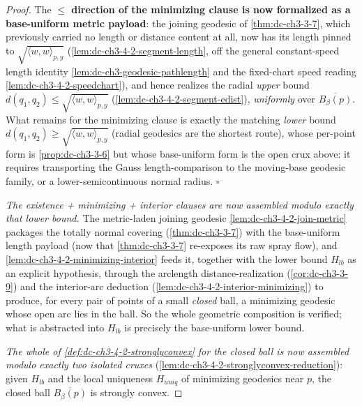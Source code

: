 \begin{proof}
  The \textbf{$\le$ direction of the minimizing clause is now formalized as a base-uniform metric
  payload}: the joining geodesic of \cref{thm:dc-ch3-3-7}, which previously carried no length or
  distance content at all, now has its length pinned to $\sqrt{\langle w,w\rangle_{p,y}}$
  (\cref{lem:dc-ch3-4-2-segment-length}, off the general constant-speed length identity
  \cref{lem:dc-ch3-geodesic-pathlength} and the fixed-chart speed reading
  \cref{lem:dc-ch3-4-2-speedchart}), and hence realizes the radial \emph{upper} bound
  $d(q_1,q_2)\le\sqrt{\langle w,w\rangle_{p,y}}$ (\cref{lem:dc-ch3-4-2-segment-edist}), \emph{uniformly}
  over $\overline{B_\beta(p)}$. What remains for the minimizing clause is exactly the matching
  \emph{lower} bound $d(q_1,q_2)\ge\sqrt{\langle w,w\rangle_{p,y}}$ (radial geodesics are the shortest
  route), whose per-point form is \cref{prop:dc-ch3-3-6} but whose base-uniform form is the open crux
  above: it requires transporting the Gauss length-comparison to the moving-base geodesic family, or
  a lower-semicontinuous normal radius. $\square$

  \emph{The existence + minimizing + interior clauses are now assembled modulo exactly that lower
  bound.} The metric-laden joining geodesic \cref{lem:dc-ch3-4-2-join-metric} packages the totally
  normal covering (\cref{thm:dc-ch3-3-7}) with the base-uniform length payload (now that
  \cref{thm:dc-ch3-3-7} re-exposes its raw spray flow), and \cref{lem:dc-ch3-4-2-minimizing-interior}
  feeds it, together with the lower bound $H_{lb}$ as an explicit hypothesis, through the
  arclength distance-realization (\cref{cor:dc-ch3-3-9}) and the interior-arc deduction
  (\cref{lem:dc-ch3-4-2-interior-minimizing}) to produce, for every pair of points of a small
  \emph{closed} ball, a minimizing geodesic whose open arc lies in the ball. So the whole geometric
  composition is verified; what is abstracted into $H_{lb}$ is precisely the base-uniform lower bound.

  \emph{The whole of \cref{def:dc-ch3-4-2-stronglyconvex} for the closed ball is now assembled modulo
  exactly two isolated cruxes} (\cref{lem:dc-ch3-4-2-stronglyconvex-reduction}): given $H_{lb}$ and the
  local uniqueness $H_{uniq}$ of minimizing geodesics near $p$, the closed ball $\overline{B_\beta(p)}$
  is strongly convex.


\end{proof}
